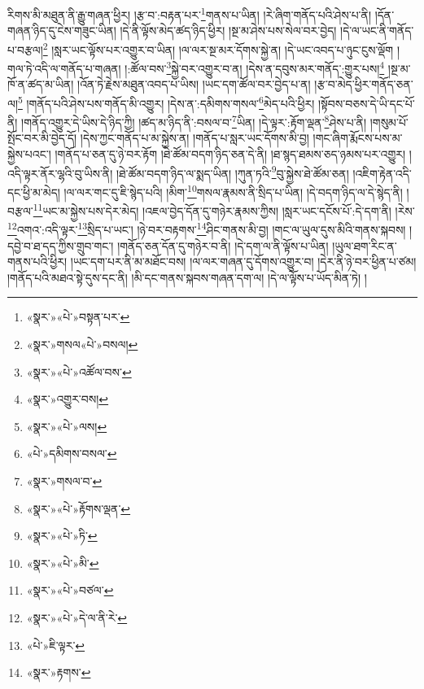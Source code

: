 རིགས་མི་མཐུན་ནི་རྒྱུ་གཞན་ཕྱིར། །རྩ་བ་:བརྟན་པར་\footnote{«སྣར་»«པེ་»བསྟན་པར་}གནས་པ་ཡིན། །རེ་ཞིག་གནོད་པའི་ཤེས་པ་ནི། །དོན་གཞན་ཉིད་དུ་ངེས་གཟུང་ཡིན། །དེ་ནི་ལྟོས་མེད་ཚད་ཉིད་ཕྱིར། །སྔ་མ་ཤེས་པས་སེལ་བར་བྱེད། །དེ་ལ་ཡང་ནི་གནོད་པ་བརྩལ།\footnote{«སྣར་»གསལ«པེ་»བསལ།} །སླར་ཡང་ལྟོས་པར་འགྱུར་བ་ཡིན། །ལ་ལར་སྔ་མར་དོགས་སྐྱེ་ན། །དེ་ཡང་འབད་པ་ཉུང་ངུས་ལྡོག །གལ་ཏེ་འདི་ལ་གནོད་པ་གཞན། །:ཚོལ་བས་\footnote{«སྣར་»«པེ་»འཚོལ་བས་}སྐྱེ་བར་འགྱུར་བ་ན། །དེས་ན་དབུས་མར་གནོད་:གྱུར་པས།\footnote{«སྣར་»འགྱུར་བས།} །སྔ་མ་ཁོ་ན་ཚད་མ་ཡིན། །འོན་ཏེ་རྗེས་མཐུན་འབད་པ་ཡིས། །ཡང་དག་ཚོལ་བར་བྱེད་པ་ན། །རྩ་བ་མེད་ཕྱིར་གནོད་ཅན་ལ།\footnote{«སྣར་»«པེ་»ལས།} །གནོད་པའི་ཤེས་པས་གནོད་མི་འགྱུར། །དེས་ན་:དམིགས་གསལ་\footnote{«པེ་»དམིགས་བསལ་}མེད་པའི་ཕྱིར། །སྟོབས་བཅས་དེ་ཡི་དང་པོ་ནི། །གནོད་འགྱུར་དེ་ཡིས་དེ་ཉིད་ཀྱི། །ཚད་མ་ཉིད་ནི་:བསལ་བ་\footnote{«སྣར་»གསལ་བ་}ཡིན། །དེ་ལྟར་:རྟོག་ལྡན་\footnote{«སྣར་»«པེ་»རྟོགས་ལྡན་}ཤེས་པ་ནི། །གསུམ་པོ་སྤོང་བར་མི་བྱེད་དོ། །དེས་ཀྱང་གནོད་པ་མ་སྐྱེས་ན། །གནོད་པ་སླར་ཡང་དོགས་མི་བྱ། །གང་ཞིག་རྨོངས་པས་མ་སྐྱེས་པའང་། །གནོད་པ་ཅན་དུ་ཉེ་བར་རྟོག །ཐེ་ཚོམ་བདག་ཉིད་ཅན་དེ་ནི། །ཐ་སྙད་ཐམས་ཅད་ཉམས་པར་འགྱུར། །འདི་ལྟར་ནོར་ལྷའི་བུ་ཡིས་ནི། །ཐེ་ཚོམ་བདག་ཉིད་ལ་སྨད་ཡིན། །ཀུན་ཏའི་\footnote{«སྣར་»«པེ་»ཏི་}བུ་སྐྱེས་ཐེ་ཚོམ་ཅན། །འཇིག་རྟེན་འདི་དང་ཕྱི་མ་མེད། །ལ་ལར་གང་དུ་ཇི་སྙེད་པའི། །མིག་\footnote{«སྣར་»«པེ་»མི་}གསལ་རྣམས་ནི་སྲིད་པ་ཡིན། །དེ་བདག་ཉིད་ལ་དེ་སྙེད་ནི། །བརྩལ་\footnote{«སྣར་»«པེ་»བཙལ་}ཡང་མ་སྐྱེས་པས་དེར་མེད། །འཇལ་བྱེད་དོན་དུ་གཉེར་རྣམས་ཀྱིས། །སླར་ཡང་དངོས་པོ་:དེ་དག་ནི། །རེས་\footnote{«སྣར་»«པེ་»དེ་ལ་ནི་རེ་}འགའ་:འདི་ལྟར་\footnote{«པེ་»ཇི་ལྟར་}སྲིད་པ་ཡང་། །ཉེ་བར་བརྟགས་\footnote{«སྣར་»རྟགས་}ཤིང་གནས་མི་བྱ། །གང་ལ་ཡུལ་དུས་མིའི་གནས་སྐབས། །དབྱེ་བ་ཐ་དད་ཀྱིས་གྲུབ་གང་། །གནོད་ཅན་དོན་དུ་གཉེར་བ་ནི། །དེ་དག་ལ་ནི་ལྟོས་པ་ཡིན། །ཡུལ་ཐག་རིང་ན་གནས་པའི་ཕྱིར། །ཡང་དག་པར་ནི་མ་མཐོང་བས། །ལ་ལར་གཞན་དུ་དོགས་འགྱུར་བ། །དེར་ནི་ཉེ་བར་ཕྱིན་པ་ཙམ། །གནོད་པའི་མཐའ་སྟེ་དུས་དང་ནི། །མི་དང་གནས་སྐབས་གཞན་དག་ལ། །དེ་ལ་ལྟོས་པ་ཡོད་མིན་ཏེ། །
